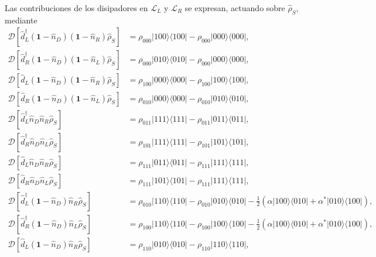 \begin{appendixs}
Las contribuciones de los disipadores en $\mathcal{L}_{L}$ y $\mathcal{L}_{R}$ se expresan, actuando sobre $\hat{\rho}_{S}$, mediante
\begin{align*}
    \mathcal{D}[\hat{d}^{\dagger}_{L}(\textbf{1}-\hat{n}_{D})(\textbf{1}-\hat{n}_{R})\hat{\rho}_{S}] & = \rho_{000}|100\rangle \langle 100| - \rho_{000}|000\rangle \langle 000|, \\ 
    \mathcal{D}[\hat{d}^{\dagger}_{R}(\textbf{1}-\hat{n}_{D})(\textbf{1}-\hat{n}_{L})\hat{\rho}_{S}] & = \rho_{000}|010\rangle \langle 010| - \rho_{000}|000\rangle \langle 000|, \\  
    \mathcal{D}[\hat{d}_{L}(\textbf{1}-\hat{n}_{D})(\textbf{1}-\hat{n}_{R})\hat{\rho}_{S}] & = \rho_{100}|000\rangle \langle 000| - \rho_{100}|100\rangle \langle 100|, \\ 
    \mathcal{D}[\hat{d}_{R}(\textbf{1}-\hat{n}_{D})(\textbf{1}-\hat{n}_{L})\hat{\rho}_{S}] & = \rho_{010}|000\rangle \langle 000| - \rho_{010}|010\rangle \langle 010|, \\ 
    \mathcal{D}[\hat{d}^{\dagger}_{L}\hat{n}_{D} \hat{n}_{R}\hat{\rho}_{S}] & = \rho_{011}|111\rangle \langle 111| - \rho_{011}|011\rangle \langle 011|, \\  
    \mathcal{D}[\hat{d}^{\dagger}_{R} \hat{n}_{D}\hat{n}_{L}\hat{\rho}_{S}] & = \rho_{101}|111\rangle \langle 111| - \rho_{101}|101\rangle \langle 101|, \\ 
     \mathcal{D}[\hat{d}_{L}\hat{n}_{D}\hat{n}_{R}\hat{\rho}_{S}] & = \rho_{111}|011\rangle \langle 011| - \rho_{111}|111\rangle \langle 111|, \\    
      \mathcal{D}[\hat{d}_{R}\hat{n}_{D}\hat{n}_{L}\hat{\rho}_{S}] & = \rho_{111}|101\rangle \langle 101| - \rho_{111}|111\rangle \langle 111|, \\ 
    \mathcal{D}[\hat{d}^{\dagger}_{L}(\textbf{1}-\hat{n}_{D})\hat{n}_{R}\hat{\rho}_{S}] & = \rho_{010}|110\rangle \langle 110| - \rho_{010}|010\rangle \langle 010| - \frac{1}{2}( \alpha|100\rangle \langle 010| + \alpha^{*}|010\rangle \langle 100|), \\ 
    \mathcal{D}[\hat{d}^{\dagger}_{R}(\textbf{1}-\hat{n}_{D})\hat{n}_{L}\hat{\rho}_{S}] & = \rho_{100}|110\rangle \langle 110| - \rho_{100}|100\rangle \langle 100| - \frac{1}{2}( \alpha |100\rangle \langle 010| + \alpha^{*}|010\rangle \langle 100| ), \\  
    \mathcal{D}[\hat{d}_{L}(\textbf{1}-\hat{n}_{D})\hat{n}_{R}\hat{\rho}_{S}] & = \rho_{110}|010\rangle \langle 010| - \rho_{110}|110\rangle \langle 110|, \\ 

\end{align*}
\end{appendixs}
